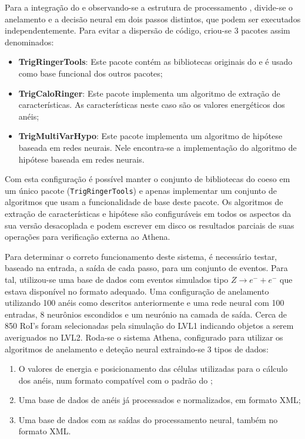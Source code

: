 Para a integração do  e observando-se a estrutura de
processamento , divide-se o anelamento e a decisão neural em dois
passos distintos, que podem ser executados independentemente. Para evitar a
dispersão de código, criou-se 3 pacotes assim denominados:

\begin{itemize}
\item \textbf{TrigRingerTools}: Este pacote contém as bibliotecas 
originais do  e é usado como base funcional dos outros
pacotes;
\item \textbf{TrigCaloRinger}: Este pacote implementa um algoritmo de 
extração de características. As características neste caso são os valores
energéticos dos anéis;
\item \textbf{TrigMultiVarHypo}: Este pacote implementa um algoritmo de
hipótese baseada em redes neurais. Nele encontra-se a implementação do
algoritmo de hipótese baseada em redes neurais. 
\end{itemize}

Com esta configuração é possível manter o conjunto de bibliotecas do
 coeso em um único pacote (\texttt{TrigRingerTools}) e
apenas implementar um conjunto de algoritmos que usam a funcionalidade de base
deste pacote. Os algoritmos de extração de características e hipótese são
configuráveis em todos os aspectos da sua versão desacoplada e podem escrever
em disco os resultados parciais de suas operações para verificação externa ao
Athena.

Para determinar o correto funcionamento deste sistema, é necessário testar,
baseado na entrada, a saída de cada passo, para um conjunto de eventos. Para
tal, utilizou-se uma base de dados com eventos simulados tipo $Z \rightarrow
e^- + e^-$ que estava disponível no formato adequado. Uma configuração de
anelamento utilizando 100 anéis como descritos anteriormente e uma rede neural
com 100 entradas, 8 neurônios escondidos e um neurónio na camada de
saída. Cerca de 850 RoI's foram selecionadas pela simulação do LVL1 indicando
objetos a serem averiguados no LVL2. Roda-se o sistema Athena, configurado
para utilizar os algoritmos de anelamento e deteção neural extraindo-se 3
tipos de dados:

\begin{enumerate}
\item O valores de energia e posicionamento das células utilizadas para o
cálculo dos anéis, num formato compatível com o padrão do ; 
\item Uma base de dados de anéis já processados e normalizados, em formato
XML;
\item Uma base de dados com as saídas do processamento neural, também no
formato XML.
\end{enumerate}

